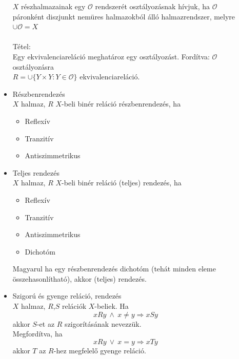 \documentclass[margin=0px]{article}
\begin{document}
\begin{description}
\begin{itemize}
							$X$ részhalmazainak egy $\mathcal{O}$ rendszerét osztályozásnak hívjuk, ha $\mathcal{O}$ páronként diszjunkt nemüres halmazokból álló halmazrendszer, melyre $\cup\mathcal{O} = X$ 
							\\\\
							Tétel: \\
							Egy ekvivalenciareláció meghatároz egy osztályozást. Fordítva: $\mathcal{O}$ osztályozásra \\ ${R = \cup\{Y\times Y : Y \in \mathcal{O} \}}$ ekvivalenciareláció.
							
						\item Részbenrendezés\\
							$X$ halmaz, $R$ $X$-beli binér reláció részbenrendezés, ha
							\begin{itemize}
								\item Reflexív
								\item Tranzitív
								\item Antiszimmetrikus
							\end{itemize}
						\item Teljes rendezés \\
							$X$ halmaz, $R$ $X$-beli binér reláció (teljes) rendezés, ha
							\begin{itemize}
								\item Reflexív
								\item Tranzitív
								\item Antiszimmetrikus
								\item Dichotóm
							\end{itemize}
							Magyarul ha egy részbenrendezés dichotóm (tehát minden eleme összehasonlítható), akkor (teljes) rendezés.
						\item Szigorú és gyenge reláció, rendezés \\
							$X$ halmaz, $R$,$S$ relációk $X$-beliek. Ha
							\[ xRy \ \land \ x \neq y \Rightarrow xSy\]
							akkor $S$-et az $R$ szigorításának nevezzük.\\
							Megfordítva, ha
							\[  xRy \ \lor \ x = y \Rightarrow xTy \]
							akkor $T$ az $R$-hez megfelelő gyenge reláció.\\
							

\end{itemize}
\end{description}
\end{document}

